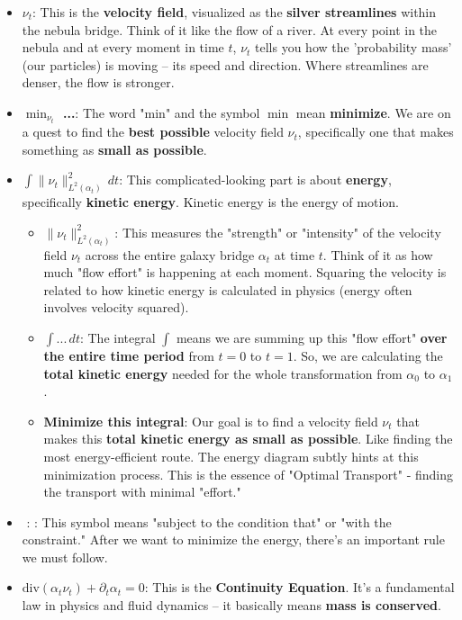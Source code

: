 \documentclass{article}
\begin{document}
\begin{itemize}
    \item \textbf{\( \nu_t \)}: This is the \textbf{velocity field}, visualized as the \textbf{silver streamlines} within the nebula bridge. Think of it like the flow of a river. At every point in the nebula and at every moment in time \( t \), \( \nu_t \) tells you how the 'probability mass' (our particles) is moving – its speed and direction.  Where streamlines are denser, the flow is stronger.
    \item \textbf{\( \min_{\nu_t} \) ...}: The word "min" and the symbol \( \min \) mean \textbf{minimize}. We are on a quest to find the \textbf{best possible} velocity field \( \nu_t \), specifically one that makes something as \textbf{small as possible}.
    \item \textbf{\( \int \|\nu_t\|_{L^2(\alpha_t)}^2 \, dt \)}: This complicated-looking part is about \textbf{energy}, specifically \textbf{kinetic energy}.  Kinetic energy is the energy of motion.
        \begin{itemize}
            \item \textbf{\( \|\nu_t\|_{L^2(\alpha_t)}^2 \)}:  This measures the "strength" or "intensity" of the velocity field \( \nu_t \) across the entire galaxy bridge \( \alpha_t \) at time \( t \). Think of it as how much "flow effort" is happening at each moment.  Squaring the velocity is related to how kinetic energy is calculated in physics (energy often involves velocity squared).
            \item \textbf{\( \int ... \, dt \)}: The integral \( \int \) means we are summing up this "flow effort" \textbf{over the entire time period} from \( t=0 \) to \( t=1 \). So, we are calculating the \textbf{total kinetic energy} needed for the whole transformation from \( \alpha_0 \) to \( \alpha_1 \).
            \item \textbf{Minimize this integral}:  Our goal is to find a velocity field \( \nu_t \) that makes this \textbf{total kinetic energy as small as possible}.  Like finding the most energy-efficient route.  The energy diagram subtly hints at this minimization process.  This is the essence of "Optimal Transport" - finding the transport with minimal "effort."
        \end{itemize}
    \item \textbf{\( \text{ : } \)}: This symbol means "subject to the condition that" or "with the constraint."  After we want to minimize the energy, there's an important rule we must follow.
    \item \textbf{\( \text{div}(\alpha_t \nu_t) + \partial_t \alpha_t = 0 \)}:  This is the \textbf{Continuity Equation}.  It's a fundamental law in physics and fluid dynamics – it basically means \textbf{mass is conserved}.

\end{itemize}
\end{document}
